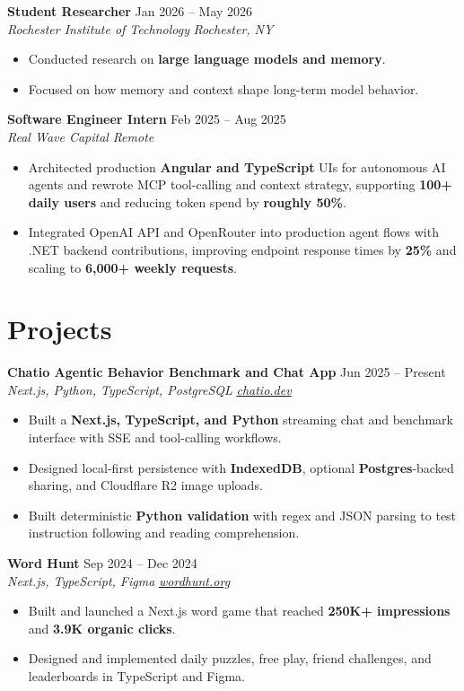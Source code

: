 \documentclass[10pt,letterpaper]{article}
\newif\ifresumeFirstRole
\newcommand{\resumeRole}[4]{%
  \ifresumeFirstRole
    \global\resumeFirstRolefalse
  \else
    \vspace{0pt plus 1fill}%
  \fi
  \textbf{#1} \hfill #2\\
  \textit{#3} \hfill \textit{#4}
}
\begin{document}
\resumeRole{Student Researcher}{Jan 2026 -- May 2026}{Rochester Institute of Technology}{Rochester, NY}
\begin{itemize}
  \item Conducted research on \textbf{large language models and memory}.
  \item Focused on how memory and context shape long-term model behavior.
\end{itemize}

\resumeRole{Software Engineer Intern}{Feb 2025 -- Aug 2025}{Real Wave Capital}{Remote}
\begin{itemize}
  \item Architected production \textbf{Angular and TypeScript} UIs for autonomous AI agents and rewrote MCP tool-calling and context strategy, supporting \textbf{100+ daily users} and reducing token spend by \textbf{roughly 50\%}.
  \item Integrated OpenAI API and OpenRouter into production agent flows with .NET backend contributions, improving endpoint response times by \textbf{25\%} and scaling to \textbf{6,000+ weekly requests}.
\end{itemize}

\section*{Projects}
\resumeRole{Chatio Agentic Behavior Benchmark and Chat App}{Jun 2025 -- Present}{Next.js, Python, TypeScript, PostgreSQL}{\href{https://chatio.dev}{chatio.dev}}
\begin{itemize}
  \item Built a \textbf{Next.js, TypeScript, and Python} streaming chat and benchmark interface with SSE and tool-calling workflows.
  \item Designed local-first persistence with \textbf{IndexedDB}, optional \textbf{Postgres}-backed sharing, and Cloudflare R2 image uploads.
  \item Built deterministic \textbf{Python validation} with regex and JSON parsing to test instruction following and reading comprehension.
\end{itemize}

\resumeRole{Word Hunt}{Sep 2024 -- Dec 2024}{Next.js, TypeScript, Figma}{\href{https://wordhunt.org}{wordhunt.org}}
\begin{itemize}
  \item Built and launched a Next.js word game that reached \textbf{250K+ impressions} and \textbf{3.9K organic clicks}.
  \item Designed and implemented daily puzzles, free play, friend challenges, and leaderboards in TypeScript and Figma.
\end{itemize}
\end{document}
